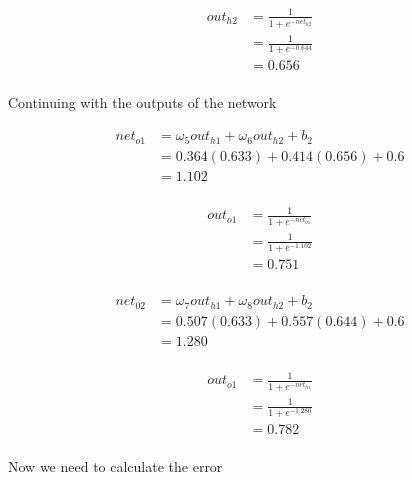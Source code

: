 \documentclass[10pt,a4paper]{article}
\begin{document}
\begin{equation}
\begin{split}
out_{h2} &= \frac{1}{1+e^{-net_{h2}}}\\ 
         &= \frac{1}{1+e^{-0.644}}\\ 
         &= 0.656\\
\end{split}
\end{equation}

Continuing with the outputs of the network

\begin{equation}
\begin{split}
net_{o1} &= \omega_5 out_{h1} + \omega_6 out_{h2} + b_2 \\
         &= 0.364(0.633) + 0.414(0.656) + 0.6 \\
         &= 1.102\\
\end{split}
\end{equation}

\begin{equation}
\begin{split}
out_{o1} &= \frac{1}{1+e^{-net_{o1}}}\\ 
         &= \frac{1}{1+e^{-1.102}}\\ 
         &= 0.751\\
\end{split}
\end{equation}

\begin{equation}
\begin{split}
net_{02} &= \omega_7 out_{h1} + \omega_8 out_{h2} + b_2 \\
         &= 0.507(0.633) + 0.557(0.644) + 0.6 \\
         &= 1.280\\
\end{split}
\end{equation}

\begin{equation}
\begin{split}
out_{o1} &= \frac{1}{1+e^{-net_{h1}}}\\ 
         &= \frac{1}{1+e^{-1.280}}\\ 
         &= 0.782\\
\end{split}
\end{equation}

Now we need to calculate the error
\end{document}

